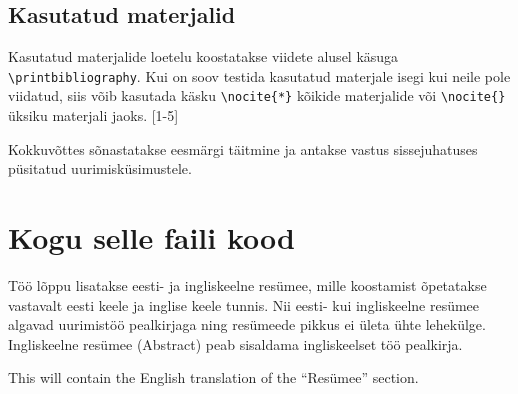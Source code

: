 \documentclass{trkut}%
\begin{document}
\section{Kasutatud materjalid}
Kasutatud materjalide loetelu koostatakse viidete alusel käsuga \verb!\printbibliography!. Kui on soov testida kasutatud materjale isegi kui neile pole viidatud, siis võib kasutada käsku \verb!\nocite{*}! kõikide materjalide või \verb!\nocite{}! üksiku materjali jaoks. \cite{palma15}[1-5]


Kokkuvõttes sõnastatakse eesmärgi täitmine ja antakse vastus sissejuhatuses püsitatud uurimisküsimustele.

\nocite{*}
\printbibliography

\appendix

\chapter{Kogu selle faili kood}
\tiny

\normalsize

\appendixend

Töö lõppu lisatakse eesti- ja ingliskeelne resümee, mille koostamist õpetatakse vastavalt eesti keele ja inglise keele tunnis. Nii eesti- kui ingliskeelne resümee algavad uurimistöö pealkirjaga ning resümeede pikkus ei ületa ühte lehekülge. Ingliskeelne resümee (Abstract) peab sisaldama ingliskeelset töö pealkirja.


This will contain the English translation of the \enquote{Resümee} section.

\kinnitusleht
\end{document}
